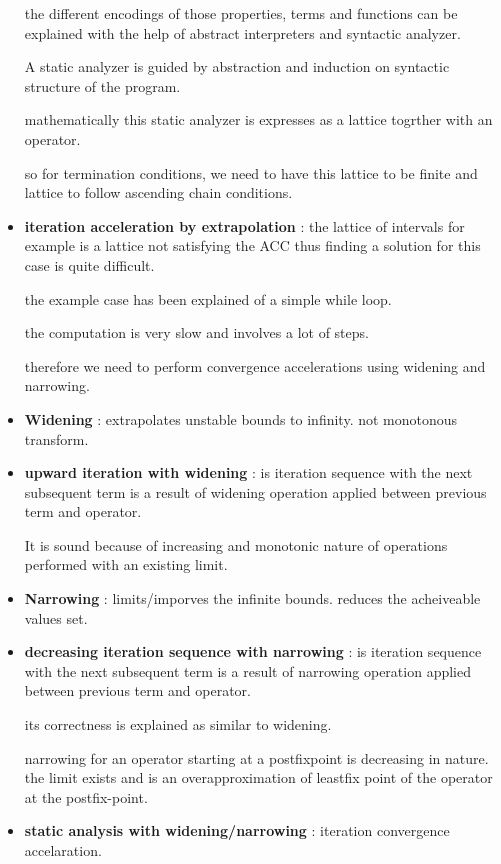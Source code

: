 \begin{itemize}
{	the different encodings of those properties, terms and functions can be explained with the help of abstract interpreters and syntactic analyzer.

	A static analyzer is guided by abstraction and induction on syntactic structure of the program.

	mathematically this static analyzer is expresses as a lattice togrther with an operator.

	so for termination conditions, we need to have this lattice to be finite and lattice to follow ascending chain conditions.
	}

	\item{\textbf{iteration acceleration by extrapolation} : the lattice of intervals for example is a lattice not satisfying the ACC thus finding a solution for this case is quite difficult. 

	the example case has been explained of a simple while loop. 

	the computation is very slow and involves a lot of steps.

	therefore we need to perform convergence accelerations using widening and narrowing.
	}

	\item{\textbf{Widening } : extrapolates unstable bounds to infinity. not monotonous transform.
	}

	\item{\textbf{upward iteration with widening} : is iteration sequence with the next subsequent term is a result of widening operation applied between previous term and operator.

	It is sound because of increasing and monotonic nature of operations performed with an existing limit.
	}

	\item{\textbf{Narrowing} : limits/imporves the infinite bounds. reduces the acheiveable values set.
	}

	\item{\textbf{decreasing iteration sequence with narrowing} : is iteration sequence with the next subsequent term is a result of narrowing operation applied between previous term and operator.

	its correctness is explained as similar to widening.

	narrowing for an operator starting at a postfixpoint is decreasing in nature. the limit exists and is an overapproximation of leastfix point of the operator at the postfix-point.
	}

	\item{\textbf{static analysis with widening/narrowing} : 
	iteration convergence accelaration.

}
\end{itemize}
